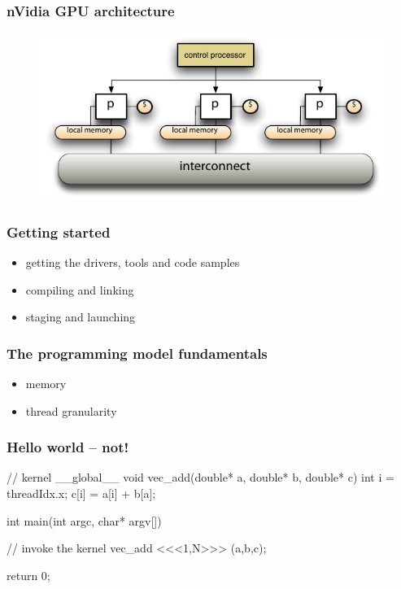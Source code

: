 \begin{frame}[fragile]
%
  \frametitle{nVidia GPU architecture}
%
  \begin{figure}
    \centering
    \includegraphics[width=1.0\linewidth]{figures/simd.pdf}
    \label{fig:simd}
  \end{figure}
%
\end{frame}

\begin{frame}[fragile]
%
  \frametitle{Getting started}
%
  \begin{itemize}
%
  \item getting the drivers, tools and code samples
%
  \item compiling and linking
%
  \item staging and launching
%
  \end{itemize}
%
\end{frame}

\begin{frame}[fragile]
%
  \frametitle{The programming model fundamentals}
%
  \begin{itemize}
%
  \item memory
%
  \item thread granularity
%
  \end{itemize}
%
\end{frame}

\begin{frame}[fragile]
%
  \frametitle{Hello world -- not!}
  \label{slide:hello-world-cuda}
%
  \begin{C}
%
// kernel
__global__ void vec_add(double* a, double* b, double* c) {
    int i = threadIdx.x;
    c[i] = a[i] + b[a];
}

int main(int argc, char* argv[]) {
  // invoke the kernel
  vec_add <<<1,N>>> (a,b,c);

  return 0;
}
%
  \end{C}
%
\end{frame}

